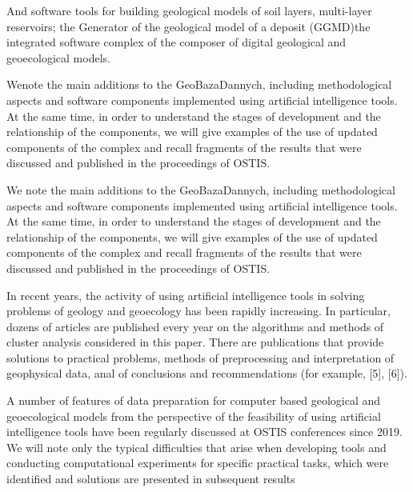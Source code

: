 \documentclass[8pt, a4paper]{article} %
\begin{document}
\fontsize{80}{14}\selectfont
\begin{multicols}{2}
\setlength{\parindent}{0.8cm}
\setlength{\parindent}{0.4cm}
\fontsize{10}{15}\selectfont 
 
 \quad And software tools for building geological models of soil layers, multi-layer reservoirs; the Generator of the geological model of a deposit (GGMD)the integrated software complex of the composer of digital geological and geoecological models.

\fontsize{10}{14}\selectfont
\quad Wenote the main additions to the GeoBazaDannych,
including methodological aspects and software components implemented using artificial intelligence tools. At
the same time, in order to understand the stages of
development and the relationship of the components, we
will give examples of the use of updated components of
the complex and recall fragments of the results that were discussed and published in the proceedings of OSTIS.

\fontsize{10}{14}\selectfont
\quad We note the main additions to the GeoBazaDannych, including methodological aspects and software components implemented using artificial intelligence tools. At
the same time, in order to understand the stages of
development and the relationship of the components, we
will give examples of the use of updated components of
the complex and recall fragments of the results that were discussed and published in the proceedings of OSTIS.

\fontsize{10}{14}\selectfont
\quad In recent years, the activity of using artificial intelligence tools in solving problems of geology and geoecology has been rapidly increasing. In particular, dozens of articles are published every year on the algorithms and methods of cluster analysis considered in this paper. There are publications that provide solutions to practical
problems, methods of preprocessing and interpretation
of geophysical data, anal of conclusions and recommendations (for example, [5], [6]).

\fontsize{10}{14}\selectfont
\quad A number of features of data preparation for computer based geological and geoecological models from the perspective of the feasibility of using artificial intelligence tools have been regularly discussed at OSTIS conferences since 2019. We will note only the typical difficulties that arise when developing tools and conducting computational experiments for specific practical tasks, which
were identified and solutions are presented in subsequent
results


\end{multicols}
\end{document}
